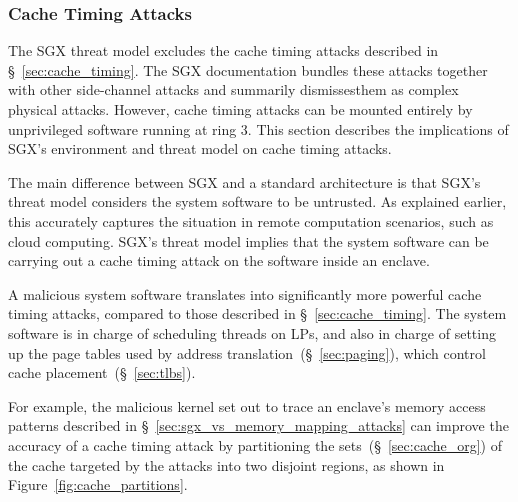 \subsubsection{Cache Timing Attacks}
\label{sec:sgx_vs_cache_timing_attacks}

The SGX threat model excludes the cache timing attacks described in
\S~\ref{sec:cache_timing}. The SGX documentation bundles these attacks together
with other side-channel attacks and summarily dismissesthem as complex physical
attacks. However, cache timing attacks can be mounted entirely by unprivileged
software running at ring 3. This section describes the implications of SGX's
environment and threat model on cache timing attacks.

The main difference between SGX and a standard architecture is that SGX's
threat model considers the system software to be untrusted. As explained
earlier, this accurately captures the situation in remote computation
scenarios, such as cloud computing. SGX's threat model implies that the system
software can be carrying out a cache timing attack on the software inside an
enclave.

A malicious system software translates into significantly more powerful cache
timing attacks, compared to those described in \S~\ref{sec:cache_timing}. The
system software is in charge of scheduling threads on LPs, and also in charge
of setting up the page tables used by address
translation~(\S~\ref{sec:paging}), which control cache
placement~(\S~\ref{sec:tlbs}).

For example, the malicious kernel set out to trace an enclave's memory access
patterns described in \S~\ref{sec:sgx_vs_memory_mapping_attacks} can improve
the accuracy of a cache timing attack by partitioning the
sets~(\S~\ref{sec:cache_org}) of the cache targeted by the attacks into two
disjoint regions, as shown in Figure~\ref{fig:cache_partitions}.


